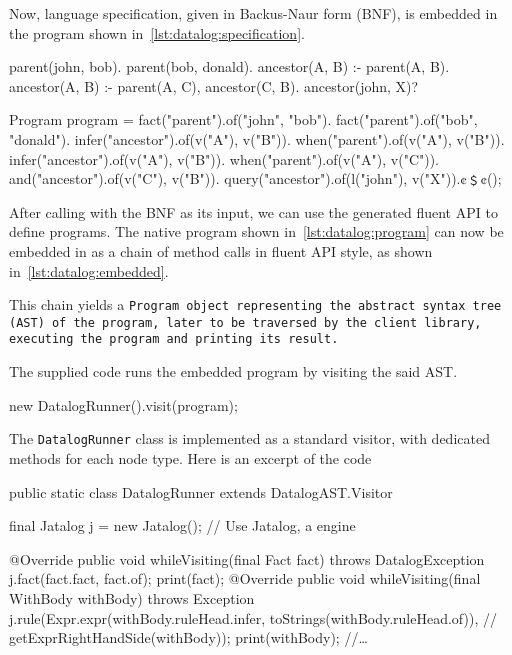 \documentclass[a4paper,UKenglish,cleveref, autoref]{darts-v2019}
\begin{document}
\begin{scope}
Now, \Datalog language specification, given in Backus-Naur form (BNF), is embedded in
the \Java program shown in~\cref{lst:datalog:specification}.
\begin{excerpt}[label={lst:datalog:program},caption=
  {\Datalog program}]
parent(john, bob).
parent(bob, donald).
ancestor(A, B) :- parent(A, B).
ancestor(A, B) :- parent(A, C), ancestor(C, B).
ancestor(john, X)?
\end{excerpt}
\begin{excerpt}[language=java,label={lst:datalog:embedded},caption=
  {Embedded \Datalog program}]
Program program =
  fact("parent").of("john", "bob").
  fact("parent").of("bob", "donald").
  infer("ancestor").of(v("A"), v("B")).
    when("parent").of(v("A"), v("B")).
  infer("ancestor").of(v("A"), v("B")).
    when("parent").of(v("A"), v("C")).
    and("ancestor").of(v("C"), v("B")).
  query("ancestor").of(l("john"), v("X")).¢﹩¢();
\end{excerpt}
After calling \Fling with the \Datalog BNF as its input, we can use the generated
fluent API to define \Datalog programs. The native \Datalog program shown in~\cref{lst:datalog:program}
can now be embedded in \Java as a chain of method calls in fluent API style, as
shown in~\cref{lst:datalog:embedded}.

This chain yields a \tt{Program} object representing the abstract syntax tree (AST)
of the program, later to be traversed by the client library, executing the program and printing
its result.

The supplied \Java code runs the embedded \Datalog program by visiting the
said AST.
\begin{excerpt}[language=java]
    new DatalogRunner().visit(program);
\end{excerpt}
The \texttt{DatalogRunner} class is implemented as a standard visitor,
with dedicated methods for each node type. Here is an excerpt of the code
\begin{excerpt}[language=java]
public static class DatalogRunner extends DatalogAST.Visitor {
  final Jatalog j = new Jatalog(); // Use Jatalog, a \Datalog engine

  @Override public void whileVisiting(final Fact fact) throws DatalogException {
    j.fact(fact.fact, fact.of);
    print(fact);
  }
  @Override public void whileVisiting(final WithBody withBody) throws Exception {
    j.rule(Expr.expr(withBody.ruleHead.infer, toStrings(withBody.ruleHead.of)), //
        getExprRightHandSide(withBody));
    print(withBody);
  }
  //…
}
\end{excerpt}


\end{scope}
\end{document}
